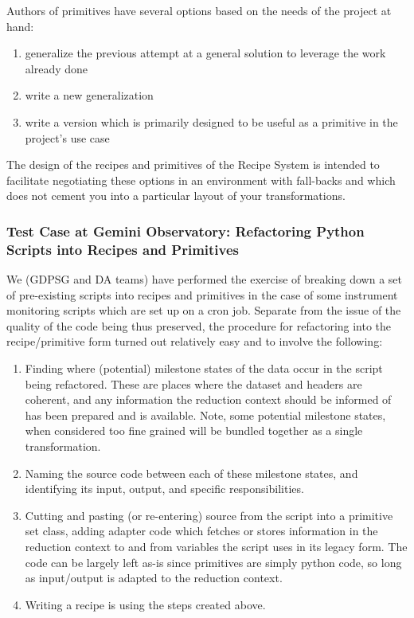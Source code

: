 \documentclass[letterpaper,10pt,english]{sphinxmanual}
\begin{document}
Authors of primitives have several options based on the needs of the
project at hand:
\begin{enumerate}
\item {} 
generalize the previous attempt at a general solution to leverage
the work already done

\item {} 
write a new generalization

\item {} 
write a version which is primarily designed to be useful as a
primitive in the project's use case

\end{enumerate}

The design of the recipes and primitives of the Recipe System is
intended to facilitate negotiating these options in an environment
with fall-backs and which does not cement you into a particular layout
of your transformations.


\subsubsection{Test Case at Gemini Observatory: Refactoring Python Scripts into Recipes and Primitives}
\label{gen.ADMANUAL_ADConcepts:test-case-at-gemini-observatory-refactoring-python-scripts-into-recipes-and-primitives}
We (GDPSG and DA teams) have performed the exercise of breaking down a
set of pre-existing scripts into recipes and primitives in the case of
some instrument monitoring scripts which are set up on a cron job.
Separate from the issue of the quality of the code being thus
preserved, the procedure for refactoring into the recipe/primitive
form turned out relatively easy and to involve the following:
\begin{enumerate}
\item {} 
Finding where (potential) milestone states of the data occur in the
script being refactored. These are places where the dataset and
headers are coherent, and any information the reduction context should
be informed of has been prepared and is available. Note, some
potential milestone states, when considered too fine grained will be
bundled together as a single transformation.

\item {} 
Naming the source code between each of these milestone states, and
identifying its input, output, and specific responsibilities.

\item {} 
Cutting and pasting (or re-entering) source from the script into a
primitive set class, adding adapter code which fetches or stores
information in the reduction context to and from variables the script
uses in its legacy form. The code can be largely left as-is since
primitives are simply python code, so long as input/output is adapted
to the reduction context.

\item {} 
Writing a recipe is using the steps created above.

\end{enumerate}
\end{document}
